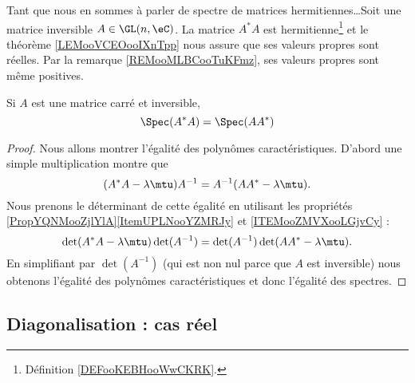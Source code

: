 Tant que nous en sommes à parler de spectre de matrices hermitiennes\ldots Soit une matrice inversible \( A\in \GL(n,\eC)\). La matrice \( A^*A\) est hermitienne\footnote{Définition \ref{DEFooKEBHooWwCKRK}.} et le théorème \ref{LEMooVCEOooIXnTpp} nous assure que ses valeurs propres sont réelles. Par la remarque \ref{REMooMLBCooTuKFmz}, ses valeurs propres sont même positives.

\begin{lemma}   \label{LEMooHUGEooVYhZdZ}
    Si \( A\) est une matrice carré et inversible,
    \begin{equation}
        \Spec(A^*A)=\Spec(AA^*)
    \end{equation}
\end{lemma}

\begin{proof}
    Nous allons montrer l'égalité des polynômes caractéristiques. D'abord une simple multiplication montre que
    \begin{equation}
        (A^*A-\lambda\mtu)A^{-1}=A^{-1}(AA^*-\lambda\mtu).
    \end{equation}
    Nous prenons le déterminant de cette égalité en utilisant les propriétés \ref{PropYQNMooZjlYlA}\ref{ItemUPLNooYZMRJy} et \ref{ITEMooZMVXooLGjvCy} :
    \begin{equation}
        \det(A^*A-\lambda\mtu)\det(A^{-1})=\det(A^{-1})\det(AA^*-\lambda\mtu).
    \end{equation}
    En simplifiant par \( \det(A^{-1})\) (qui est non nul parce que \( A\) est inversible) nous obtenons l'égalité des polynômes caractéristiques et donc l'égalité des spectres.
\end{proof}

\subsection{Diagonalisation : cas réel}


